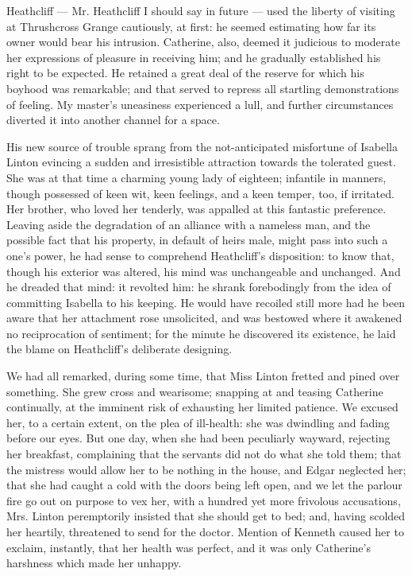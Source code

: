 \par Heathcliff — Mr. Heathcliff I should say in future — used the liberty of visiting at Thrushcross Grange cautiously, at first: he seemed estimating how far its owner would bear his intrusion. Catherine, also, deemed it judicious to moderate her expressions of pleasure in receiving him; and he gradually established his right to be expected. He retained a great deal of the reserve for which his boyhood was remarkable; and that served to repress all startling demonstrations of feeling. My master's uneasiness experienced a lull, and further circumstances diverted it into another channel for a space.
\par His new source of trouble sprang from the not-anticipated misfortune of Isabella Linton evincing a sudden and irresistible attraction towards the tolerated guest. She was at that time a charming young lady of eighteen; infantile in manners, though possessed of keen wit, keen feelings, and a keen temper, too, if irritated. Her brother, who loved her tenderly, was appalled at this fantastic preference. Leaving aside the degradation of an alliance with a nameless man, and the possible fact that his property, in default of heirs male, might pass into such a one's power, he had sense to comprehend Heathcliff's disposition: to know that, though his exterior was altered, his mind was unchangeable and unchanged. And he dreaded that mind: it revolted him: he shrank forebodingly from the idea of committing Isabella to his keeping. He would have recoiled still more had he been aware that her attachment rose unsolicited, and was bestowed where it awakened no reciprocation of sentiment; for the minute he discovered its existence, he laid the blame on Heathcliff's deliberate designing.
\par We had all remarked, during some time, that Miss Linton fretted and pined over something. She grew cross and wearisome; snapping  at and teasing Catherine continually, at the imminent risk of exhausting her limited patience. We excused her, to a certain extent, on the plea of ill-health: she was dwindling and fading before our eyes. But one day, when she had been peculiarly wayward, rejecting her breakfast, complaining that the servants did not do what she told them; that the mistress would allow her to be nothing in the house, and Edgar neglected her; that she had caught a cold with the doors being left open, and we let the parlour fire go out on purpose to vex her, with a hundred yet more frivolous accusations, Mrs. Linton peremptorily insisted that she should get to bed; and, having scolded her heartily, threatened to send for the doctor. Mention of Kenneth caused her to exclaim, instantly, that her health was perfect, and it was only Catherine's harshness which made her unhappy.
